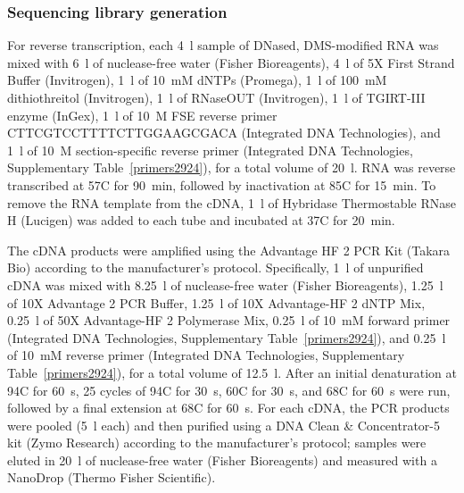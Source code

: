 \documentclass[main.tex]{subfiles}
\begin{document}
\subsubsection{Sequencing library generation}

For reverse transcription, each 4~\textmu l sample of DNased, DMS-modified RNA was mixed with 6~\textmu l of nuclease-free water (Fisher Bioreagents), 4~\textmu l of 5X First Strand Buffer (Invitrogen), 1~\textmu l of 10~mM dNTPs (Promega), 1~\textmu l of 100~mM dithiothreitol (Invitrogen), 1~\textmu l of RNaseOUT (Invitrogen), 1~\textmu l of TGIRT-III enzyme (InGex), 1~\textmu l of 10~\textmu M FSE reverse primer CTTCGTCCTTTTCTTGGAAGCGACA (Integrated DNA Technologies), and 1~\textmu l of 10~\textmu M section-specific reverse primer (Integrated DNA Technologies, Supplementary Table~\ref{primers2924}), for a total volume of 20~\textmu l.
RNA was reverse transcribed at 57\textdegree C for 90~min, followed by inactivation at 85\textdegree C for 15~min.
To remove the RNA template from the cDNA, 1~\textmu l of Hybridase Thermostable RNase H (Lucigen) was added to each tube and incubated at 37\textdegree C for 20~min.

The cDNA products were amplified using the Advantage HF 2 PCR Kit (Takara Bio) according to the manufacturer's protocol.
Specifically, 1~\textmu l of unpurified cDNA was mixed with 8.25~\textmu l of nuclease-free water (Fisher Bioreagents), 1.25~\textmu l of 10X Advantage 2 PCR Buffer, 1.25~\textmu l of 10X Advantage-HF 2 dNTP Mix, 0.25~\textmu l of 50X Advantage-HF 2 Polymerase Mix, 0.25~\textmu l of 10~mM forward primer (Integrated DNA Technologies, Supplementary Table~\ref{primers2924}), and 0.25~\textmu l of 10~mM reverse primer (Integrated DNA Technologies, Supplementary Table~\ref{primers2924}), for a total volume of 12.5~\textmu l.
After an initial denaturation at 94\textdegree C for 60~s, 25 cycles of 94\textdegree C for 30~s, 60\textdegree C for 30~s, and 68\textdegree C for 60~s were run, followed by a final extension at 68\textdegree C for 60~s.
For each cDNA, the PCR products were pooled (5~\textmu l each) and then purified using a DNA Clean \& Concentrator-5 kit (Zymo Research) according to the manufacturer's protocol; samples were eluted in 20~\textmu l of nuclease-free water (Fisher Bioreagents) and measured with a NanoDrop (Thermo Fisher Scientific).
\end{document}
